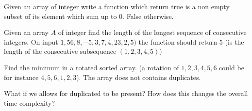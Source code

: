  \begin{problem}
Given an array of integer write a function which return true is a non empty subset of its element which sum up to $0$. False otherwise. 
\end{problem}

 \begin{problem}
Given an array $A$ of integer find the length of the  longest sequence of consecutive integers. On input $1,56,8,-5,3,7,4,23,2,5)$ the function should return 5 (is the length of the consecutive subsequence $(1,2,3,4,5)$)
 \end{problem}

 \begin{problem}
Find the minimum in a rotated sorted array. (a rotation of $1,2,3,4,5,6$ could be for instance $4,5,6,1,2,3$). The array does not contains duplicates.

What if we allows for duplicated to be present? How does this changes the overall time complexity?
 \end{problem}

